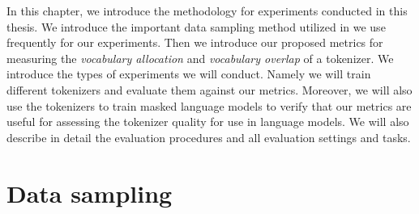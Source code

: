 In this chapter, we introduce the methodology for experiments conducted in this thesis. We introduce the important data sampling method utilized in \citet{devlin_bert_2019,conneau_unsupervised_2020} we use frequently for our experiments. Then we introduce our proposed metrics for measuring the \textit{vocabulary allocation} and \textit{vocabulary overlap} of a tokenizer. We introduce the types of experiments we will conduct. Namely we will train different tokenizers and evaluate them against our metrics. Moreover, we will also use the tokenizers to train masked language models to verify that our metrics are useful for assessing the tokenizer quality for use in language models. We will also describe in detail the evaluation procedures and all evaluation settings and tasks. 





\section{Data sampling}
\label{sec:data_sampling}


